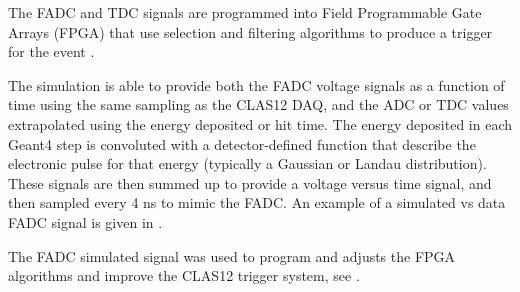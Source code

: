 The FADC and TDC signals are programmed into Field Programmable Gate Arrays (FPGA) that use selection and filtering
algorithms to produce a trigger for the event \cite{trigger-nim}.

The simulation is able to provide both the FADC voltage signals as a function of time using the same sampling
as the CLAS12 DAQ, and the ADC or TDC values extrapolated using the energy deposited or hit time.
The energy deposited in each Geant4 step is convoluted with
a detector-defined function that describe the electronic pulse for that energy (typically a Gaussian or Landau distribution).
These signals are then summed up to provide a voltage versus time signal, and then sampled every 4 ns to mimic
the FADC. An example of a simulated vs data FADC signal is given in .

The FADC simulated signal was used to program and adjusts the FPGA algorithms and improve the CLAS12 trigger system,
see \cite{trigger-nim}.


